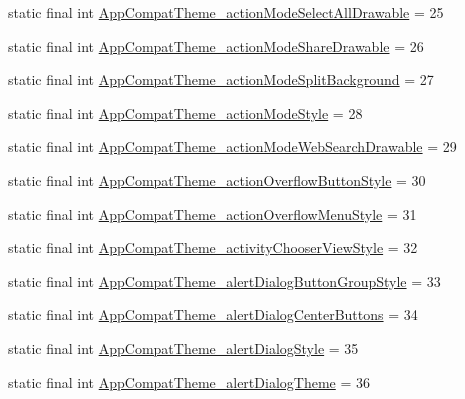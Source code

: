\begin{DoxyCompactItemize}
static final int \mbox{\hyperlink{classcom_1_1synnapps_1_1carouselview_1_1_r_1_1styleable_a54c6bd26eaac435bcb3727759777fbdf}{App\+Compat\+Theme\+\_\+action\+Mode\+Select\+All\+Drawable}} = 25
\item 
static final int \mbox{\hyperlink{classcom_1_1synnapps_1_1carouselview_1_1_r_1_1styleable_a7c672190ed4264cf5e15249d5c17e669}{App\+Compat\+Theme\+\_\+action\+Mode\+Share\+Drawable}} = 26
\item 
static final int \mbox{\hyperlink{classcom_1_1synnapps_1_1carouselview_1_1_r_1_1styleable_a6919d030ecf2f885482a3bb61f2971a9}{App\+Compat\+Theme\+\_\+action\+Mode\+Split\+Background}} = 27
\item 
static final int \mbox{\hyperlink{classcom_1_1synnapps_1_1carouselview_1_1_r_1_1styleable_afaf9b8f96cbbba83b8140680ad5de6e9}{App\+Compat\+Theme\+\_\+action\+Mode\+Style}} = 28
\item 
static final int \mbox{\hyperlink{classcom_1_1synnapps_1_1carouselview_1_1_r_1_1styleable_a7dbfc08087ac3beaf630b1b9e30ccd85}{App\+Compat\+Theme\+\_\+action\+Mode\+Web\+Search\+Drawable}} = 29
\item 
static final int \mbox{\hyperlink{classcom_1_1synnapps_1_1carouselview_1_1_r_1_1styleable_a794cb738cdcd2ba801d8dc955e4cd681}{App\+Compat\+Theme\+\_\+action\+Overflow\+Button\+Style}} = 30
\item 
static final int \mbox{\hyperlink{classcom_1_1synnapps_1_1carouselview_1_1_r_1_1styleable_a240351ea679fd735db9244d69874626f}{App\+Compat\+Theme\+\_\+action\+Overflow\+Menu\+Style}} = 31
\item 
static final int \mbox{\hyperlink{classcom_1_1synnapps_1_1carouselview_1_1_r_1_1styleable_abadf0dc6811985eb141a6c0dae8882d4}{App\+Compat\+Theme\+\_\+activity\+Chooser\+View\+Style}} = 32
\item 
static final int \mbox{\hyperlink{classcom_1_1synnapps_1_1carouselview_1_1_r_1_1styleable_a2537548b21df63655faad0254efb1716}{App\+Compat\+Theme\+\_\+alert\+Dialog\+Button\+Group\+Style}} = 33
\item 
static final int \mbox{\hyperlink{classcom_1_1synnapps_1_1carouselview_1_1_r_1_1styleable_a7776f76644a89b0cdbc5742e9f5ecca1}{App\+Compat\+Theme\+\_\+alert\+Dialog\+Center\+Buttons}} = 34
\item 
static final int \mbox{\hyperlink{classcom_1_1synnapps_1_1carouselview_1_1_r_1_1styleable_a304b08c0309d529f829fbba90280bcd7}{App\+Compat\+Theme\+\_\+alert\+Dialog\+Style}} = 35
\item 
static final int \mbox{\hyperlink{classcom_1_1synnapps_1_1carouselview_1_1_r_1_1styleable_a3f1b34bc3067ff4d40e2defecb6e362e}{App\+Compat\+Theme\+\_\+alert\+Dialog\+Theme}} = 36

\end{DoxyCompactItemize}
